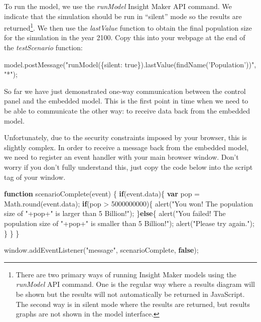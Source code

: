 \documentclass[]{memoir}
\newenvironment{Shaded}{}{}
\newcommand{\KeywordTok}[1]{\textcolor[rgb]{0.00,0.44,0.13}{\textbf{{#1}}}}
\newcommand{\DecValTok}[1]{\textcolor[rgb]{0.25,0.63,0.44}{{#1}}}
\newcommand{\StringTok}[1]{\textcolor[rgb]{0.25,0.44,0.63}{{#1}}}
\newcommand{\OtherTok}[1]{\textcolor[rgb]{0.00,0.44,0.13}{{#1}}}
\newcommand{\FunctionTok}[1]{\textcolor[rgb]{0.02,0.16,0.49}{{#1}}}
\newcommand{\NormalTok}[1]{{#1}}
\begin{document}
To run the model, we use the \emph{runModel} Insight Maker API command.
We indicate that the simulation should be run in ``silent'' mode so the
results are returned\footnote{There are two primary ways of running
  Insight Maker models using the \emph{runModel} API command. One is the
  regular way where a results diagram will be shown but the results will
  not automatically be returned in JavaScript. The second way is in
  silent mode where the results are returned, but results graphs are not
  shown in the model interface.}. We then use the \emph{lastValue}
function to obtain the final population size for the simulation in the
year 2100. Copy this into your webpage at the end of the
\emph{testScenario} function:

\begin{Shaded}
\begin{Highlighting}[]
\OtherTok{model}\NormalTok{.}\FunctionTok{postMessage}\NormalTok{(}\StringTok{"runModel(\{silent: true\}).lastValue(findName('Population'))"}\NormalTok{, }\StringTok{"*"}\NormalTok{);}
\end{Highlighting}
\end{Shaded}

So far we have just demonstrated one-way communication between the
control panel and the embedded model. This is the first point in time
when we need to be able to communicate the other way: to receive data
back from the embedded model.

Unfortunately, due to the security constraints imposed by your browser,
this is slightly complex. In order to receive a message back from the
embedded model, we need to register an event handler with your main
browser window. Don't worry if you don't fully understand this, just
copy the code below into the script tag of your window.

\begin{Shaded}
\begin{Highlighting}[]
\KeywordTok{function} \FunctionTok{scenarioComplete}\NormalTok{(event)}
\NormalTok{\{}
    \KeywordTok{if}\NormalTok{(}\OtherTok{event}\NormalTok{.}\FunctionTok{data}\NormalTok{)\{}
        \KeywordTok{var} \NormalTok{pop = }\OtherTok{Math}\NormalTok{.}\FunctionTok{round}\NormalTok{(}\OtherTok{event}\NormalTok{.}\FunctionTok{data}\NormalTok{);}
        \KeywordTok{if}\NormalTok{(pop > }\DecValTok{5000000000}\NormalTok{)\{}
            \FunctionTok{alert}\NormalTok{(}\StringTok{"You won! The population size of "}\NormalTok{+pop+}\StringTok{" is larger than 5 Billion!"}\NormalTok{);}
        \NormalTok{\}}\KeywordTok{else}\NormalTok{\{}
            \FunctionTok{alert}\NormalTok{(}\StringTok{"You failed! The population size of "}\NormalTok{+pop+}\StringTok{" is smaller than 5 Billion!"}\NormalTok{);}
            \FunctionTok{alert}\NormalTok{(}\StringTok{"Please try again."}\NormalTok{);}
        \NormalTok{\}}
    \NormalTok{\}}
\NormalTok{\}}

\OtherTok{window}\NormalTok{.}\FunctionTok{addEventListener}\NormalTok{(}\StringTok{"message"}\NormalTok{, scenarioComplete, }\KeywordTok{false}\NormalTok{);}
\end{Highlighting}
\end{Shaded}
\end{document}
